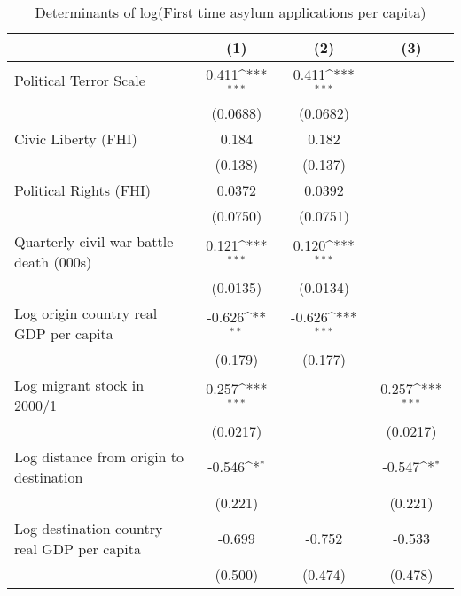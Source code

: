 \begin{table}[htbp]\centering
\def\sym#1{\ifmmode^{#1}\else\(^{#1}\)\fi}
\caption{Determinants of log(First time asylum applications per capita)}
\begin{tabular}{l*{3}{c}}
\hline\hline
                    &\multicolumn{1}{c}{(1)}         &\multicolumn{1}{c}{(2)}         &\multicolumn{1}{c}{(3)}         \\
\hline
Political Terror Scale&       0.411\sym{***}&       0.411\sym{***}&                     \\
                    &    (0.0688)         &    (0.0682)         &                     \\
[1em]
Civic Liberty (FHI) &       0.184         &       0.182         &                     \\
                    &     (0.138)         &     (0.137)         &                     \\
[1em]
Political Rights (FHI)&      0.0372         &      0.0392         &                     \\
                    &    (0.0750)         &    (0.0751)         &                     \\
[1em]
Quarterly civil war battle death (000s)&       0.121\sym{***}&       0.120\sym{***}&                     \\
                    &    (0.0135)         &    (0.0134)         &                     \\
[1em]
Log origin country real GDP per capita&      -0.626\sym{**} &      -0.626\sym{***}&                     \\
                    &     (0.179)         &     (0.177)         &                     \\
[1em]
Log migrant stock in 2000/1&       0.257\sym{***}&                     &       0.257\sym{***}\\
                    &    (0.0217)         &                     &    (0.0217)         \\
[1em]
Log distance from origin to destination&      -0.546\sym{*}  &                     &      -0.547\sym{*}  \\
                    &     (0.221)         &                     &     (0.221)         \\
[1em]
Log destination country real GDP per capita&      -0.699         &      -0.752         &      -0.533         \\
                    &     (0.500)         &     (0.474)         &     (0.478)         \\

\end{tabular}
\end{table}
